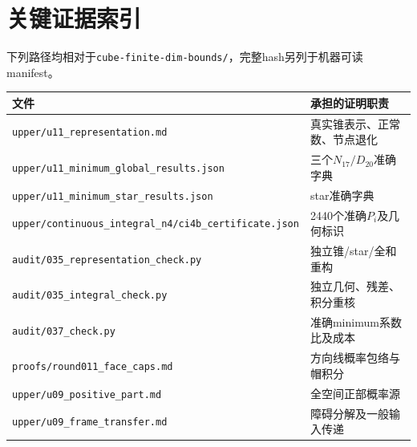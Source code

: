 \documentclass[UTF8,11pt,a4paper,fontset=fandol]{ctexart}
\theoremstyle{remark}\newtheorem{remark}[theorem]{注}
\newcommand{\1}{\mathbf1}\newcommand{\pos}[1]{(#1)_+}
\begin{document}
\section{关键证据索引}
下列路径均相对于\texttt{cube-finite-dim-bounds/}，完整hash另列于机器可读manifest。
\begin{center}\small
\begin{tabular}{p{.59\linewidth}p{.32\linewidth}}\toprule
文件&承担的证明职责\\\midrule
\texttt{upper/u11\_representation.md}&真实锥表示、正常数、节点退化\\
\texttt{upper/u11\_minimum\_global\_results.json}&三个$N_{17}/D_{20}$准确字典\\
\texttt{upper/u11\_minimum\_star\_results.json}&star准确字典\\
\texttt{upper/continuous\_integral\_n4/ci4b\_certificate.json}&2440个准确$P_i$及几何标识\\
\texttt{audit/035\_representation\_check.py}&独立锥/star/全和重构\\
\texttt{audit/035\_integral\_check.py}&独立几何、残差、积分重核\\
\texttt{audit/037\_check.py}&准确minimum系数比及成本\\
\texttt{proofs/round011\_face\_caps.md}&方向线概率包络与帽积分\\
\texttt{upper/u09\_positive\_part.md}&全空间正部概率源\\
\texttt{upper/u09\_frame\_transfer.md}&障碍分解及一般输入传递\\\bottomrule
\end{tabular}
\end{center}



\end{document}
